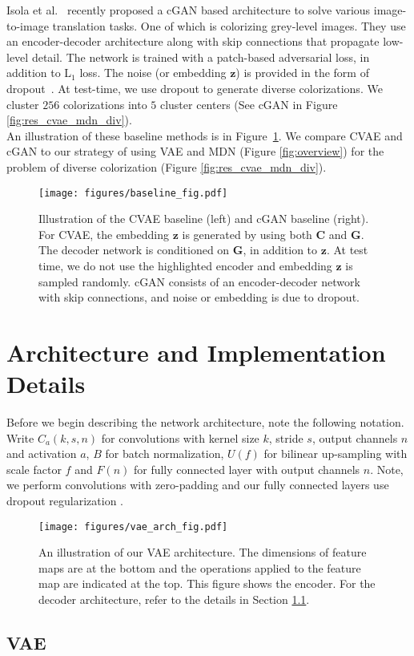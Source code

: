\documentclass[10pt,twocolumn,letterpaper]{article}
\begin{document}
 Isola et al.~\cite{Isola} recently
proposed a cGAN based architecture to solve various image-to-image translation tasks.
One of which is colorizing grey-level images. They use an encoder-decoder architecture
along with skip connections that propagate low-level detail. The network is trained
with a patch-based adversarial loss, in addition to L$_{1}$ loss. The noise 
(or embedding $\mathbf{z}$) is provided in the form of dropout~\cite{Srivastava}. 
At test-time, we use dropout to generate diverse colorizations. We cluster
$256$ colorizations into $5$ cluster centers (See cGAN in 
Figure \ref{fig:res_cvae_mdn_div}). \\

An illustration of these baseline methods is in Figure~\ref{fig:baseline}. We compare 
CVAE and cGAN to our strategy of using VAE and MDN (Figure \ref{fig:overview}) for the 
problem of diverse colorization (Figure \ref{fig:res_cvae_mdn_div}).

\begin{figure}[t]
\centering
\texttt{[image: figures/baseline\_fig.pdf]}
\caption{Illustration of the CVAE baseline (left) and cGAN baseline (right). For CVAE, the
embedding $\mathbf{z}$ is generated by using both $\mathbf{C}$ and $\mathbf{G}$. The decoder
network is conditioned on $\mathbf{G}$, in addition to $\mathbf{z}$. At test time, we
do not use the highlighted encoder and embedding $\mathbf{z}$ is sampled randomly. 
cGAN consists of an encoder-decoder network with skip connections, and noise or 
embedding is due to dropout.} 
\label{fig:baseline} 
\end{figure}
\section{Architecture and Implementation Details} Before we begin describing the network architecture, note
the following notation. Write $C_{a}(k, s, n)$ for convolutions with kernel size 
$k$, stride $s$, output channels $n$ and activation $a$, $B$ for batch 
normalization, $U(f)$ for bilinear up-sampling with scale factor $f$ and 
$F(n)$ for fully connected layer with output channels $n$. Note, we perform
convolutions with zero-padding and our fully connected layers use dropout
regularization \cite{Srivastava}. \\

\begin{figure}[t]
\centering
\texttt{[image: figures/vae\_arch\_fig.pdf]}
\caption{An illustration of our VAE architecture. The dimensions of feature maps are at
the bottom and the operations applied to the feature map are indicated at the top. This 
figure shows the encoder. For the decoder architecture, refer to the details in 
Section \ref{sec:arch_vae}.} 
\label{fig:vae_arch} 
\end{figure}\subsection{VAE}\label{sec:arch_vae}
\end{document}
